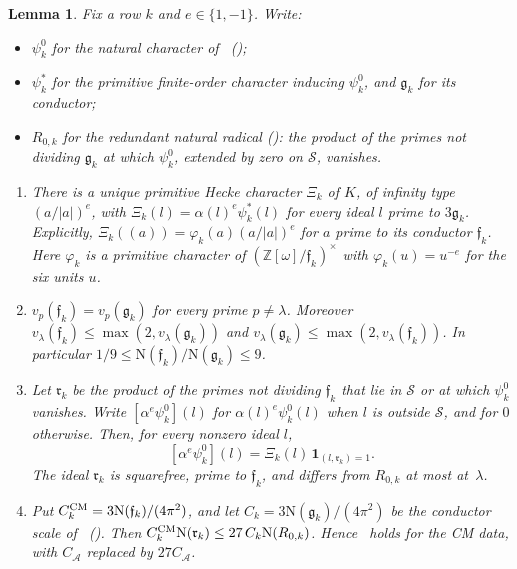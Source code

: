 \documentclass[11pt]{article}
\numberwithin{equation}{section}
\newcommand{\OO}{\mathbb Z[\omega]}
\newcommand{\N}{\mathrm N}
\newcommand{\ind}{\mathbf1}
\newtheorem{lemma}{Lemma}
\begin{document}
\begin{lemma}\label{lem:s5-rowchar}
Fix a row $k$ and $e\in\{1,-1\}$. Write:
\begin{itemize}
\item $\psi_k^0$ for the natural character of~\cite{OAI78} (\cite[Section~18.1]{OAI78});
\item $\psi_k^*$ for the primitive finite-order character inducing $\psi_k^0$, and $\mathfrak g_k$ for its
 conductor;
\item $R_{0,k}$ for the redundant natural radical (\cite[Section~18.1]{OAI78}): the product of the primes not dividing
 $\mathfrak g_k$ at which $\psi_k^0$, extended by zero on $\mathcal S$, vanishes.
\end{itemize}
\begin{enumerate}
\item[(a)] There is a unique primitive Hecke character $\Xi_k$ of $K$, of infinity type $(a/|a|)^e$, with
 $\Xi_k(l)=\alpha(l)^e\psi_k^*(l)$ for every ideal $l$ prime to $3\mathfrak g_k$. Explicitly,
 $\Xi_k((a))=\varphi_k(a)(a/|a|)^e$ for $a$ prime to its conductor $\mathfrak f_k$. Here $\varphi_k$ is a
 primitive character of $(\OO/\mathfrak f_k)^\times$ with $\varphi_k(u)=u^{-e}$ for the six units $u$.
\item[(b)] $v_p(\mathfrak f_k)=v_p(\mathfrak g_k)$ for every prime $p\ne\lambda$. Moreover
 $v_\lambda(\mathfrak f_k)\le\max(2,v_\lambda(\mathfrak g_k))$ and
 $v_\lambda(\mathfrak g_k)\le\max(2,v_\lambda(\mathfrak f_k))$. In particular
 $1/9\le\N(\mathfrak f_k)/\N(\mathfrak g_k)\le9$.
\item[(c)] Let $\mathfrak r_k$ be the product of the primes not dividing $\mathfrak f_k$ that lie in
 $\mathcal S$ or at which $\psi_k^0$ vanishes. Write $[\alpha^e\psi_k^0](l)$ for $\alpha(l)^e\psi_k^0(l)$
 when $l$ is outside $\mathcal S$, and for $0$ otherwise. Then, for every nonzero ideal $l$,
 \begin{equation}\label{eq:s5-natural}
 [\alpha^e\psi_k^0](l)=\Xi_k(l)\,\ind_{(l,\mathfrak r_k)=1}.
 \end{equation}
 The ideal $\mathfrak r_k$ is squarefree, prime to $\mathfrak f_k$, and differs from $R_{0,k}$ at most
 at~$\lambda$.
\item[(d)] Put $C_k^{\rm CM}=3\N(\mathfrak f_k)/(4\pi^2)$, and let $C_k=3\N(\mathfrak g_k)/(4\pi^2)$ be the
 conductor scale of~\cite{OAI78} (\cite[Section~18.1]{OAI78}). Then $C_k^{\rm CM}\N(\mathfrak r_k)\le27\,C_k\N(R_{0,k})$.
 Hence~\cite[eq.~(18.7)]{OAI78} holds for the CM data, with $C_{\mathcal A}$ replaced by
 $27C_{\mathcal A}$.
\end{enumerate}
\end{lemma}
\end{document}

